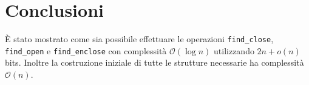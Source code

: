 \documentclass{article}
\begin{document}
\section{Conclusioni}
È stato mostrato come sia possibile effettuare le operazioni \texttt{find\_close}, \texttt{find\_open} e \texttt{find\_enclose} con complessità $\mathcal{O}(\log{n})$ utilizzando $2n+o(n)$ bits. Inoltre la costruzione iniziale di tutte le strutture necessarie ha complessità $\mathcal{O}(n)$.
\end{document}
